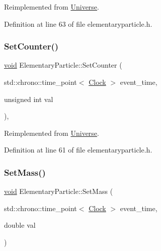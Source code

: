 Reimplemented from \mbox{\hyperlink{class_universe_a3b3da7c86a7b75e5e5c0b7972ac82a87}{Universe}}.



Definition at line 63 of file elementaryparticle.\+h.

\mbox{\label{class_elementary_particle_a141316fd968cce8ecc5aa11ce0757d63}} 
\subsubsection{\texorpdfstring{Set\+Counter()}{SetCounter()}}
{\footnotesize\ttfamily \mbox{\hyperlink{glad_8h_a950fc91edb4504f62f1c577bf4727c29}{void}} Elementary\+Particle\+::\+Set\+Counter (\begin{DoxyParamCaption}\item[{std\+::chrono\+::time\+\_\+point$<$ \mbox{\hyperlink{universe_8h_a0ef8d951d1ca5ab3cfaf7ab4c7a6fd80}{Clock}} $>$}]{event\+\_\+time,  }\item[{unsigned int}]{val }\end{DoxyParamCaption})\hspace{0.3cm}{\ttfamily [inline]}, {\ttfamily [virtual]}}



Reimplemented from \mbox{\hyperlink{class_universe_aa22202ae740eb1355529afcb13285e91}{Universe}}.



Definition at line 61 of file elementaryparticle.\+h.

\mbox{\label{class_elementary_particle_a778ff8188ecb369e533521ed4f94b034}} 
\subsubsection{\texorpdfstring{Set\+Mass()}{SetMass()}}
{\footnotesize\ttfamily \mbox{\hyperlink{glad_8h_a950fc91edb4504f62f1c577bf4727c29}{void}} Elementary\+Particle\+::\+Set\+Mass (\begin{DoxyParamCaption}\item[{std\+::chrono\+::time\+\_\+point$<$ \mbox{\hyperlink{universe_8h_a0ef8d951d1ca5ab3cfaf7ab4c7a6fd80}{Clock}} $>$}]{event\+\_\+time,  }\item[{double}]{val }\end{DoxyParamCaption})}



